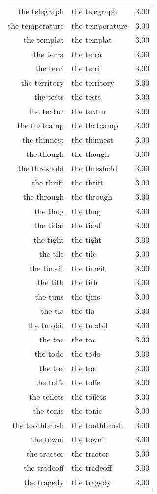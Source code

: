 \begin{table}[ht]
\begin{tabular}{rlr}
  the telegraph & the telegraph & 3.00 \\ 
  the temperature & the temperature & 3.00 \\ 
  the templat & the templat & 3.00 \\ 
  the terra & the terra & 3.00 \\ 
  the terri & the terri & 3.00 \\ 
  the territory & the territory & 3.00 \\ 
  the tests & the tests & 3.00 \\ 
  the textur & the textur & 3.00 \\ 
  the thatcamp & the thatcamp & 3.00 \\ 
  the thinnest & the thinnest & 3.00 \\ 
  the though & the though & 3.00 \\ 
  the threshold & the threshold & 3.00 \\ 
  the thrift & the thrift & 3.00 \\ 
  the through & the through & 3.00 \\ 
  the thug & the thug & 3.00 \\ 
  the tidal & the tidal & 3.00 \\ 
  the tight & the tight & 3.00 \\ 
  the tile & the tile & 3.00 \\ 
  the timeit & the timeit & 3.00 \\ 
  the tith & the tith & 3.00 \\ 
  the tjms & the tjms & 3.00 \\ 
  the tla & the tla & 3.00 \\ 
  the tmobil & the tmobil & 3.00 \\ 
  the toc & the toc & 3.00 \\ 
  the todo & the todo & 3.00 \\ 
  the toe & the toe & 3.00 \\ 
  the toffe & the toffe & 3.00 \\ 
  the toilets & the toilets & 3.00 \\ 
  the tonic & the tonic & 3.00 \\ 
  the toothbrush & the toothbrush & 3.00 \\ 
  the towni & the towni & 3.00 \\ 
  the tractor & the tractor & 3.00 \\ 
  the tradeoff & the tradeoff & 3.00 \\ 
  the tragedy & the tragedy & 3.00 \\ 

\end{tabular}
\end{table}
